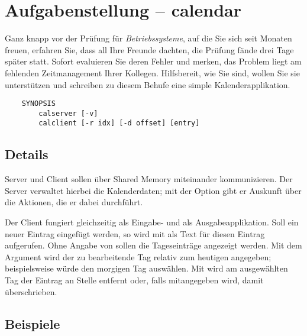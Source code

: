 




\section*{Aufgabenstellung -- calendar}

Ganz knapp vor der Prüfung für \emph{Betriebssysteme}, auf die Sie sich seit
Monaten freuen, erfahren Sie, dass all Ihre Freunde dachten, die Prüfung fände
drei Tage später statt. Sofort evaluieren Sie deren Fehler und merken, das
Problem liegt am fehlenden Zeitmanagement Ihrer Kollegen. Hilfsbereit, wie Sie
sind, wollen Sie sie unterstützen und schreiben zu diesem Behufe eine simple
Kalenderapplikation.

\begin{verbatim}
    SYNOPSIS
        calserver [-v]
        calclient [-r idx] [-d offset] [entry]
\end{verbatim}

\subsection*{Details}

Server und Client sollen über Shared Memory miteinander kommunizieren. Der
Server verwaltet hierbei die Kalenderdaten; mit der Option  gibt er
Auskunft über die Aktionen, die er dabei durchführt.

Der Client fungiert gleichzeitig als Eingabe- und als Ausgabeapplikation. Soll
ein neuer Eintrag eingefügt werden, so wird  mit
 als Text für diesen Eintrag aufgerufen. Ohne Angabe von
 sollen die Tageseinträge angezeigt werden. Mit dem Argument
 wird der zu bearbeitende Tag relativ zum heutigen angegeben;
beispielsweise würde  den morgigen Tag auswählen. Mit  wird am ausgewählten Tag der Eintrag an Stelle  entfernt
oder, falls  mitangegeben wird, damit überschrieben.

\subsection*{Beispiele}


